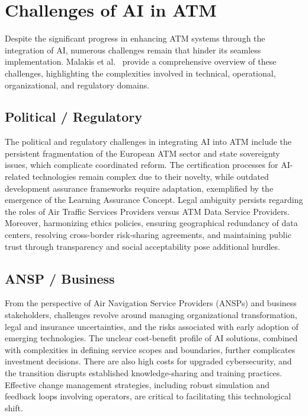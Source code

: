 \section{Challenges of AI in ATM}

Despite the significant progress in enhancing \gls{ATM} systems through the integration of \gls{AI}, numerous challenges remain that hinder its seamless implementation. 
Malakis et al.~\cite{Malakis_2022} provide a comprehensive overview of these challenges, highlighting the complexities involved in technical, operational, organizational, and regulatory domains. 


\subsection{Political / Regulatory}

The political and regulatory challenges in integrating \gls{AI} into \gls{ATM} include the persistent fragmentation of the European \gls{ATM} sector and state sovereignty issues, which complicate coordinated reform. 
The certification processes for \gls{AI}-related technologies remain complex due to their novelty, while outdated development assurance frameworks require adaptation, exemplified by the emergence of the Learning Assurance Concept. 
Legal ambiguity persists regarding the roles of Air Traffic Services Providers versus \gls{ATM} Data Service Providers. 
Moreover, harmonizing ethics policies, ensuring geographical redundancy of data centers, resolving cross-border risk-sharing agreements, and maintaining public trust through transparency and social acceptability pose additional hurdles.

\subsection{ANSP / Business}

From the perspective of Air Navigation Service Providers (ANSPs) and business stakeholders, challenges revolve around managing organizational transformation, legal and insurance uncertainties, and the risks associated with early adoption of emerging technologies. 
The unclear cost-benefit profile of \gls{AI} solutions, combined with complexities in defining service scopes and boundaries, further complicates investment decisions. 
There are also high costs for upgraded cybersecurity, and the transition disrupts established knowledge-sharing and training practices.
Effective change management strategies, including robust simulation and feedback loops involving operators, are critical to facilitating this technological shift.

